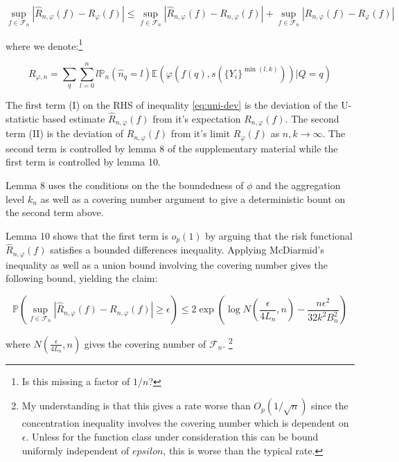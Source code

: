 \documentclass[a4paper,10pt]{article}
\begin{document}
\begin{equation} \label{eq:uni-dev}
  \sup_{f \in \mathcal{F}_n} \left| \hat{R}_{n, \varphi}(f) - R_\varphi(f) \right| \leq
  \sup_{f \in \mathcal{F}_n} \left| \hat{R}_{n, \varphi}(f) - R_{n, \varphi}(f) \right| +
  \sup_{f \in \mathcal{F}_n} \left| R_{n, \varphi}(f) - R_{\varphi}(f) \right|
\end{equation}

where we denote:\footnote{Is this missing a factor of \(1/n\)?}

\begin{equation}
  R_{\varphi, n} = \sum_q\sum_{l=0}^n l \mathbb{P}_n(\hat{n}_q = l) \mathbb{E}(\varphi(f(q), s(\{Y_i\}^{\min(l, k)}))|Q=q)
\end{equation}

The first term (I) on the RHS of inequality \ref{eq:uni-dev} is the deviation of the U-statistic based estimate \(\hat{R}_{n, \varphi}(f)\) from it's expectation \(R_{n, \varphi}(f)\). The second term (II) is the deviation of \(R_{n, \varphi}(f)\) from it's limit \(R_{\varphi}(f)\) as \(n, k \rightarrow \infty\). The second term is controlled by lemma 8 of the supplementary material \cite{duchi-2013-ranking} while the first term is controlled by lemma 10.

Lemma 8 uses the conditions on the the boundedness of \(\phi\) and the aggregation level \(k_n\) as well as a covering number argument to give a deterministic bount on the second term above.

Lemma 10 shows that the first term is \(o_p(1)\) by arguing that the risk functional \(\hat{R}_{n, \varphi}(f)\) satisfies a bounded differences inequality. Applying McDiarmid's inequality as well as a union bound involving the covering number gives the following bound, yielding the claim:

\begin{equation}
  \mathbb{P}\left( \sup_{f \in \mathcal{F}_n} \left| \hat{R}_{n, \varphi}(f) - R_{n, \varphi}(f) \right| \geq \epsilon \right) \leq 2\exp\left( \log N \left( \frac{\epsilon}{4L_n}, n \right) - \frac{n \epsilon^2}{32k^2B_n^2} \right)
\end{equation}

where \(N \left( \frac{\epsilon}{4L_n}, n \right)\) gives the covering number of \(\mathcal{F}_n\).
\footnote{My understanding is that this gives a rate worse than \(O_p(1/\sqrt n)\) since the concentration inequality involves the covering number which is dependent on \(\epsilon\). Unless for the function class under consideration this can be bound uniformly independent of \(epsilon\), this is worse than the typical rate.}
\end{document}
